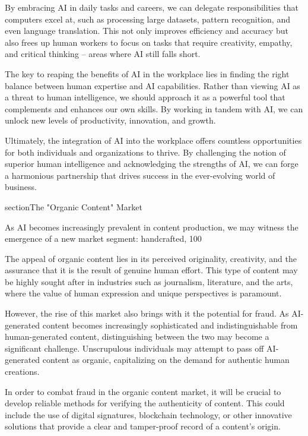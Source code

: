 By embracing AI in daily tasks and careers, we can delegate responsibilities that computers excel at, such as processing large datasets, pattern recognition, and even language translation. This not only improves efficiency and accuracy but also frees up human workers to focus on tasks that require creativity, empathy, and critical thinking – areas where AI still falls short.

The key to reaping the benefits of AI in the workplace lies in finding the right balance between human expertise and AI capabilities. Rather than viewing AI as a threat to human intelligence, we should approach it as a powerful tool that complements and enhances our own skills. By working in tandem with AI, we can unlock new levels of productivity, innovation, and growth.

Ultimately, the integration of AI into the workplace offers countless opportunities for both individuals and organizations to thrive. By challenging the notion of superior human intelligence and acknowledging the strengths of AI, we can forge a harmonious partnership that drives success in the ever-evolving world of business.

section{The "Organic Content" Market}

As AI becomes increasingly prevalent in content production, we may witness the emergence of a new market segment: handcrafted, 100%

The appeal of organic content lies in its perceived originality, creativity, and the assurance that it is the result of genuine human effort. This type of content may be highly sought after in industries such as journalism, literature, and the arts, where the value of human expression and unique perspectives is paramount.

However, the rise of this market also brings with it the potential for fraud. As AI-generated content becomes increasingly sophisticated and indistinguishable from human-generated content, distinguishing between the two may become a significant challenge. Unscrupulous individuals may attempt to pass off AI-generated content as organic, capitalizing on the demand for authentic human creations.

In order to combat fraud in the organic content market, it will be crucial to develop reliable methods for verifying the authenticity of content. This could include the use of digital signatures, blockchain technology, or other innovative solutions that provide a clear and tamper-proof record of a content's origin.

